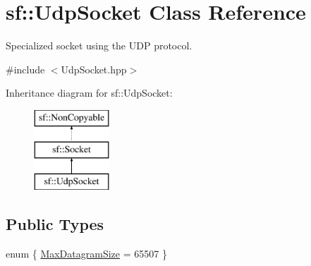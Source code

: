 \hypertarget{classsf_1_1_udp_socket}{}\section{sf\+:\+:Udp\+Socket Class Reference}
\label{classsf_1_1_udp_socket}


Specialized socket using the U\+DP protocol.  




{\ttfamily \#include $<$Udp\+Socket.\+hpp$>$}

Inheritance diagram for sf\+:\+:Udp\+Socket\+:\begin{figure}[H]
\begin{center}
\leavevmode
\includegraphics[height=3.000000cm]{classsf_1_1_udp_socket}
\end{center}
\end{figure}
\subsection*{Public Types}
\begin{DoxyCompactItemize}
\item 
enum \{ \hyperlink{classsf_1_1_udp_socket_afff8d18b342f92ba5ec47bb7ba9622baa728a7d33027bee0d65f70f964dd9c9eb}{Max\+Datagram\+Size} = 65507
 \}
\end{DoxyCompactItemize}
